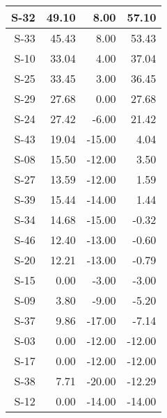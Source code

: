 \begin{tabular}{ | r | r | r | r | }
    \hline
                  S-32  &           49.10  &            8.00  &           57.10  \\
    \hline
                  S-33  &           45.43  &            8.00  &           53.43  \\
    \hline
                  S-10  &           33.04  &            4.00  &           37.04  \\
    \hline
                  S-25  &           33.45  &            3.00  &           36.45  \\
    \hline
                  S-29  &           27.68  &            0.00  &           27.68  \\
    \hline
                  S-24  &           27.42  &           -6.00  &           21.42  \\
    \hline
                  S-43  &           19.04  &          -15.00  &            4.04  \\
    \hline
                  S-08  &           15.50  &          -12.00  &            3.50  \\
    \hline
                  S-27  &           13.59  &          -12.00  &            1.59  \\
    \hline
                  S-39  &           15.44  &          -14.00  &            1.44  \\
    \hline
                  S-34  &           14.68  &          -15.00  &           -0.32  \\
    \hline
                  S-46  &           12.40  &          -13.00  &           -0.60  \\
    \hline
                  S-20  &           12.21  &          -13.00  &           -0.79  \\
    \hline
                  S-15  &            0.00  &           -3.00  &           -3.00  \\
    \hline
                  S-09  &            3.80  &           -9.00  &           -5.20  \\
    \hline
                  S-37  &            9.86  &          -17.00  &           -7.14  \\
    \hline
                  S-03  &            0.00  &          -12.00  &          -12.00  \\
    \hline
                  S-17  &            0.00  &          -12.00  &          -12.00  \\
    \hline
                  S-38  &            7.71  &          -20.00  &          -12.29  \\
    \hline
                  S-12  &            0.00  &          -14.00  &          -14.00  \\

\end{tabular}
